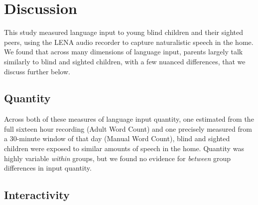 \documentclass[
  man,floatsintext]{apa6}
\begin{document}
\hypertarget{discussion}{%
\section{Discussion}\label{discussion}}

This study measured language input to young blind children and their sighted peers, using the LENA audio recorder to capture naturalistic speech in the home. We found that across many dimensions of language input, parents largely talk similarly to blind and sighted children, with a few nuanced differences, that we discuss further below.

\hypertarget{quantity-1}{%
\subsection{Quantity}\label{quantity-1}}

Across both of these measures of language input quantity, one estimated from the full sixteen hour recording (Adult Word Count) and one precisely measured from a 30-minute window of that day (Manual Word Count), blind and sighted children were exposed to similar amounts of speech in the home. Quantity was highly variable \emph{within} groups, but we found no evidence for \emph{between} group differences in input quantity.

\hypertarget{interactivity-2}{%
\subsection{Interactivity}\label{interactivity-2}}
\end{document}

